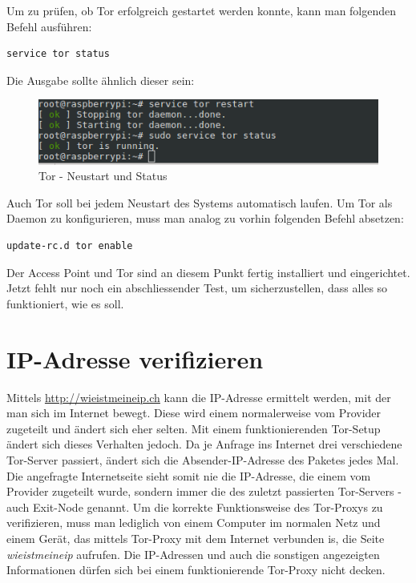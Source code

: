Um zu prüfen, ob Tor erfolgreich gestartet werden konnte, kann man folgenden Befehl ausführen:

\begin{lstlisting}
service tor status
\end{lstlisting}

Die Ausgabe sollte ähnlich dieser sein:

\begin{figure}[h]
\centering
\includegraphics[scale=0.7]{images/tor_service}
\caption{Tor - Neustart und Status}
\end{figure}

Auch Tor soll bei jedem Neustart des Systems automatisch laufen. Um Tor als Daemon zu konfigurieren, muss man analog zu vorhin folgenden Befehl absetzen:

\begin{lstlisting}
update-rc.d tor enable
\end{lstlisting}

Der Access Point und Tor sind an diesem Punkt fertig installiert und eingerichtet. Jetzt fehlt nur noch ein abschliessender Test, um sicherzustellen, dass alles so funktioniert, wie es soll.

\section{IP-Adresse verifizieren}
Mittels \url{http://wieistmeineip.ch} kann die IP-Adresse ermittelt werden, mit der man sich im Internet bewegt. Diese wird einem normalerweise vom Provider zugeteilt und ändert sich eher selten. Mit einem funktionierenden Tor-Setup ändert sich dieses Verhalten jedoch. Da je Anfrage ins Internet drei verschiedene Tor-Server passiert, ändert sich die Absender-IP-Adresse des Paketes jedes Mal. Die angefragte Internetseite sieht somit nie die IP-Adresse, die einem vom Provider zugeteilt wurde, sondern immer die des zuletzt passierten Tor-Servers - auch Exit-Node genannt. Um die korrekte Funktionsweise des Tor-Proxys zu verifizieren, muss man lediglich von einem Computer im normalen Netz und einem Gerät, das mittels Tor-Proxy mit dem Internet verbunden is, die Seite \textit{wieistmeineip} aufrufen. Die IP-Adressen und auch die sonstigen angezeigten Informationen dürfen sich bei einem funktionierende Tor-Proxy nicht decken.



